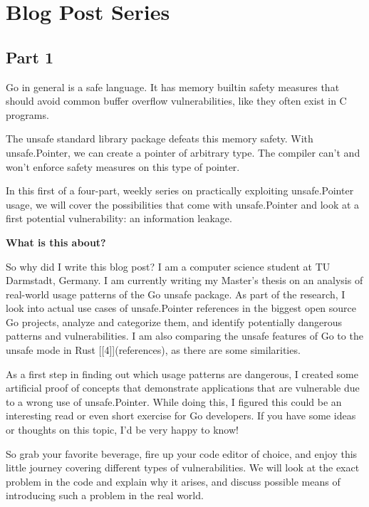 
\chapter{Blog Post Series}



\section{Part 1}

Go in general is a safe language. It has memory builtin safety measures that should avoid common buffer overflow 
vulnerabilities, like they often exist in C programs.

The unsafe standard library package defeats this memory safety. With unsafe.Pointer, we can create a pointer of 
arbitrary type. The compiler can't and won't enforce safety measures on this type of pointer.

In this first of a four-part, weekly series on practically exploiting unsafe.Pointer usage, we will cover the possibilities
that come with unsafe.Pointer and look at a first potential vulnerability: an information leakage.


\textbf{What is this about?}

So why did I write this blog post? I am a computer science student at TU Darmstadt, Germany. I am currently writing my
Master's thesis on an analysis of real-world usage patterns of the Go unsafe package. As part of the research, I look
into actual use cases of unsafe.Pointer references in the biggest open source Go projects, analyze and categorize them,
and identify potentially dangerous patterns and vulnerabilities. I am also comparing the unsafe features of Go to the
unsafe mode in Rust [[4]](references), as there are some similarities.

As a first step in finding out which usage patterns are dangerous, I created some artificial proof of concepts that
demonstrate applications that are vulnerable due to a wrong use of unsafe.Pointer. While doing this, I figured this
could be an interesting read or even short exercise for Go developers. If you have some ideas or thoughts on this topic,
I'd be very happy to know!

So grab your favorite beverage, fire up your code editor of choice, and enjoy this little journey covering different
types of vulnerabilities. We will look at the exact problem in the code and explain why it arises, and discuss possible
means of introducing such a problem in the real world.


